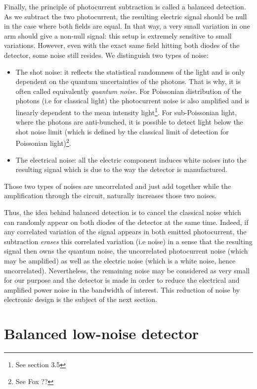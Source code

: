 \documentclass[11pt]{report}
\begin{document}
Finally, the principle of photocurrent subtraction is called a balanced detection. As we subtract the two photocurrent, the resulting electric signal should be null in the case where both fields are equal. In that way, a very small variation in one arm should give a non-null signal: this setup is extremely sensitive to small variations. However, even with the exact same field hitting both diodes of the detector, some noise still resides. We distinguish two types of noise:
\begin{itemize}
	\item The shot noise: it reflects the statistical randomness of the light and is only dependent on the quantum uncertainties of the photons. That is why, it is often called equivalently \textit{quantum noise}. For Poissonian distribution of the photons (i.e for classical light) the photocurrent noise is also amplified and is linearly dependent to the mean intensity light\footnote{See section 3.5}. For sub-Poissonian light, where the photons are anti-bunched, it is possible to detect light below the shot noise limit (which is defined by the classical limit of detection for Poissonian light)\footnote{See Fox ??}.
	\item The electrical noise: all the electric component induces white noises into the resulting signal which is due to the way the detector is manufactured.
\end{itemize} 
Those two types of noises are uncorrelated and just add together while the amplification through the circuit, naturally increases those two noises. 

Thus, the idea behind balanced detection is to cancel the classical noise which can randomly appear on both diodes of the detector at the same time. Indeed, if any correlated variation of the signal appears in both emitted photocurrent, the subtraction \textit{erases} this correlated variation (i.e noise) in a sense that the resulting signal then owns the quantum noise, the uncorrelated photocurrent noise (which may be amplified) as well as the electric noise (which is a white noise, hence uncorrelated). Nevertheless, the remaining noise may be considered as very small for our purpose and the detector is made in order to reduce the electrical and amplified power noise in the bandwidth of interest. This reduction of noise by electronic design is the subject of the next section.

\section{Balanced low-noise detector}
\end{document}
